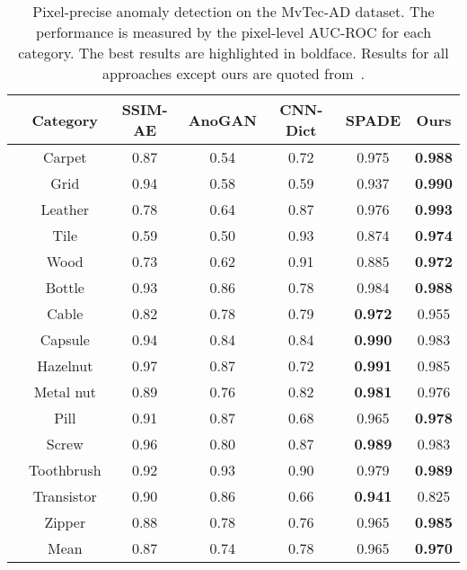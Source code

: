 \documentclass[final]{cvpr}
\begin{document}
{\begin{table}[!t]
	\centering
	\caption{Pixel-precise anomaly detection on the MvTec-AD dataset. The performance is measured by the pixel-level AUC-ROC for each category. The best results are highlighted in boldface. Results for all approaches except ours are quoted from~\cite{Cohen2020}.}
	\label{tab2}
	\vspace{0.5em}
	\begin{adjustbox}{width=0.48\textwidth}
		\begin{tabular}{c|c|c c c c c}
			\hline
			& Category & SSIM-AE &  AnoGAN & CNN-Dict & SPADE & Ours \\ \hline
			\multirow{5}{*}{\rotatebox{90}{Textures}}
			&  Carpet     & 0.87 & 0.54 & 0.72 & 0.975 & \textbf{0.988} \\
			& Grid       & 0.94 & 0.58 & 0.59 & 0.937 & \textbf{0.990} \\
			& Leather    & 0.78 & 0.64 & 0.87 & 0.976 & \textbf{0.993} \\
			& Tile       & 0.59 & 0.50 & 0.93 & 0.874 &\textbf{0.974} \\
			& Wood       & 0.73 & 0.62 & 0.91 & 0.885 &\textbf{0.972} \\ \hline
			\multirow{10}{*}{\rotatebox{90}{Objects}}
			& Bottle     & 0.93 & 0.86 & 0.78 & 0.984 & \textbf{0.988} \\
			& Cable      & 0.82 & 0.78 & 0.79 & \textbf{0.972} & 0.955 \\
			& Capsule    & 0.94 & 0.84 & 0.84 & \textbf{0.990} & 0.983 \\
			& Hazelnut   & 0.97 & 0.87 & 0.72 & \textbf{0.991} & 0.985 \\
			& Metal nut  & 0.89 & 0.76 & 0.82 & \textbf{0.981} & 0.976 \\
			& Pill       & 0.91 & 0.87 & 0.68 & 0.965 & \textbf{0.978} \\
			& Screw      & 0.96 & 0.80 & 0.87 & \textbf{0.989} & 0.983 \\
			& Toothbrush & 0.92 & 0.93 & 0.90 & 0.979 & \textbf{0.989} \\
			& Transistor & 0.90 & 0.86 & 0.66 & \textbf{0.941} & 0.825 \\
			& Zipper     & 0.88 & 0.78 & 0.76 & 0.965 & \textbf{0.985} \\ \hline \hline
			& Mean       & 0.87 & 0.74 & 0.78 & 0.965 &\textbf{0.970} \\
			\hline
		\end{tabular}
	\end{adjustbox}
\end{table}












}
\end{document}
